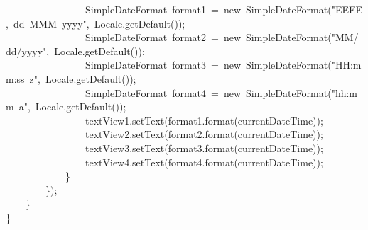 {\ttfamily\small \ \ \ \ \ \ \ \ \ \ \ \ \ \ \ \ SimpleDateFormat\ format1\ =\ new\ SimpleDateFormat("EEEE,\ dd\ MMM\ yyyy",\ Locale.getDefault());} \\
{\ttfamily\small \ \ \ \ \ \ \ \ \ \ \ \ \ \ \ \ SimpleDateFormat\ format2\ =\ new\ SimpleDateFormat("MM/dd/yyyy",\ Locale.getDefault());} \\
{\ttfamily\small \ \ \ \ \ \ \ \ \ \ \ \ \ \ \ \ SimpleDateFormat\ format3\ =\ new\ SimpleDateFormat("HH:mm:ss\ z",\ Locale.getDefault());} \\
{\ttfamily\small \ \ \ \ \ \ \ \ \ \ \ \ \ \ \ \ SimpleDateFormat\ format4\ =\ new\ SimpleDateFormat("hh:mm\ a",\ Locale.getDefault());} \\
{\ttfamily\small \ \ \ \ \ \ \ \ \ \ \ \ \ \ \ \ textView1.setText(format1.format(currentDateTime));} \\
{\ttfamily\small \ \ \ \ \ \ \ \ \ \ \ \ \ \ \ \ textView2.setText(format2.format(currentDateTime));} \\
{\ttfamily\small \ \ \ \ \ \ \ \ \ \ \ \ \ \ \ \ textView3.setText(format3.format(currentDateTime));} \\
{\ttfamily\small \ \ \ \ \ \ \ \ \ \ \ \ \ \ \ \ textView4.setText(format4.format(currentDateTime));} \\
{\ttfamily\small \ \ \ \ \ \ \ \ \ \ \ \ \}} \\
{\ttfamily\small \ \ \ \ \ \ \ \ \});} \\
{\ttfamily\small \ \ \ \ \}} \\
{\ttfamily\small \}} \\
